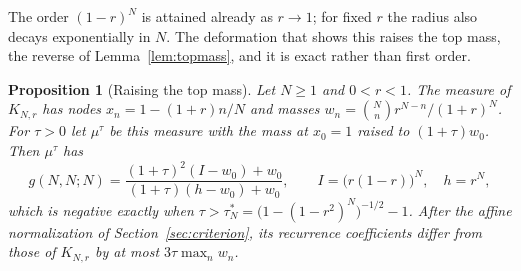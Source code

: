 \documentclass[twoside,10pt]{article}
\numberwithin{equation}{section}
\theoremstyle{slbody}
\newtheorem{proposition}[theorem]{Proposition}
\theoremstyle{definition}
\theoremstyle{remark}
\begin{document}
The order $(1-r)^N$ is attained already as $r\to1$; for fixed $r$ the radius also decays exponentially in $N$. The deformation that shows this raises the top mass, the reverse of Lemma~\ref{lem:topmass}, and it is exact rather than first order.

\begin{proposition}[Raising the top mass]\label{prop:raise}
Let $N\geq1$ and $0<r<1$. The measure of $K_{N,r}$ has nodes $x_n=1-(1+r)n/N$ and masses $w_n=\binom Nnr^{N-n}/(1+r)^N$. For $\tau>0$ let $\mu^\tau$ be this measure with the mass at $x_0=1$ raised to $(1+\tau)w_0$. Then $\mu^\tau$ has
\[
g(N,N;N)=\frac{(1+\tau)^2(I-w_0)+w_0}{(1+\tau)(h-w_0)+w_0},\qquad I=\bigl(r(1-r)\bigr)^N,\quad h=r^N,
\]
which is negative exactly when $\tau>\tau_N^*=\bigl(1-(1-r^2)^N\bigr)^{-1/2}-1$. After the affine normalization of Section~\ref{sec:criterion}, its recurrence coefficients differ from those of $K_{N,r}$ by at most $3\tau\max_nw_n$.
\end{proposition}
\end{document}
